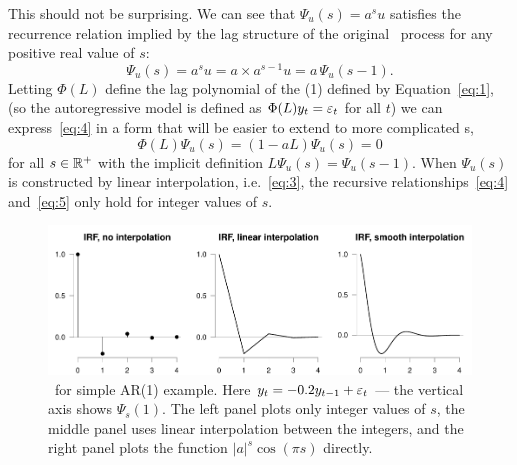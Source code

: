\documentclass[12pt,fleqn]{article}
\begin{document}
This should not be surprising. We can see that $\Psi_u(s) = a^s u$
satisfies the recurrence relation implied by the lag structure of the
original \AR\ process for any positive real value of $s$:
\begin{equation}
  \label{eq:4}
  \Psi_u(s) = a^s u = a \times a^{s-1} u = a \, \Psi_u(s-1).
\end{equation}
Letting $\Phi(L)$ define the lag polynomial of the \AR(1) defined by
Equation~\eqref{eq:1}, (so the autoregressive model is defined as
$\Phi(L)y_t = \varepsilon_t$ for all $t$) we can express~\eqref{eq:4} in a
form that will be easier to extend to more complicated \DGP s,
\begin{equation}
  \label{eq:5}
  \Phi(L) \Psi_u(s) = (1 - a L) \Psi_{u}(s) = 0
\end{equation}
for all $s \in \mathbb{R}^+$ with the implicit definition
$L \Psi_u(s) = \Psi_u(s-1)$. When $\Psi_u(s)$ is constructed by linear
interpolation, i.e.~\eqref{eq:3}, the recursive
relationships~\eqref{eq:4} and~\eqref{eq:5} only hold for integer
values of $s$.

\begin{figure}[t]
  \centering
  \includegraphics{graphs/motivation2.pdf}
  \caption{\IRF\ for simple AR(1) example. Here $y_t = -0.2 y_{t-1} +
    \varepsilon_t$ --- the vertical axis shows $\Psi_s(1)$. The left panel
    plots only integer values of $s$, the middle panel uses linear
    interpolation between the integers, and the right panel plots the
    function $|a|^s \cos(\pi s)$ directly.}
  \label{fig:2}
\end{figure}
\end{document}
